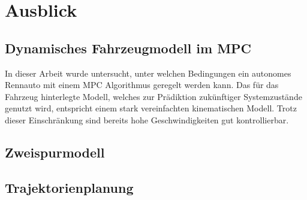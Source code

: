 \documentclass{like}
\begin{document}
\section{Ausblick}
\subsection{Dynamisches Fahrzeugmodell im MPC}
In dieser Arbeit wurde untersucht, unter welchen Bedingungen ein autonomes Rennauto mit einem \acl{MPC} Algorithmus geregelt werden kann. Das für das Fahrzeug hinterlegte Modell, welches zur Prädiktion zukünftiger Systemzustände genutzt wird, entspricht einem stark vereinfachten kinematischen Modell. Trotz dieser Einschränkung sind bereits hohe Geschwindigkeiten gut kontrollierbar. 
\subsection{Zweispurmodell}
\subsection{Trajektorienplanung}




\appendix





%



%


\end{document}
